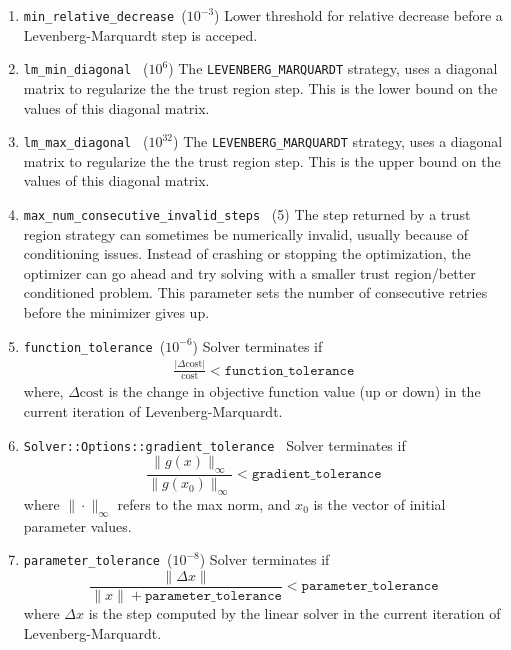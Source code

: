 \begin{enumerate}
\item{\texttt{min\_relative\_decrease }}($10^{-3}$) Lower threshold
  for relative decrease before a Levenberg-Marquardt step is acceped.

\item{\texttt{lm\_min\_diagonal } ($10^6$)} The
  \texttt{LEVENBERG\_MARQUARDT} strategy, uses a diagonal matrix to
  regularize the the trust region step. This is the lower bound on the
  values of this diagonal matrix.

\item{\texttt{lm\_max\_diagonal } ($10^{32}$)}  The
  \texttt{LEVENBERG\_MARQUARDT} strategy, uses a diagonal matrix to
  regularize the the trust region step. This is the upper bound on the
  values of this diagonal matrix.

\item{\texttt{max\_num\_consecutive\_invalid\_steps } (5)} The step
  returned by a trust region strategy can sometimes be numerically
  invalid, usually because of conditioning issues. Instead of crashing
  or stopping the optimization, the optimizer can go ahead and try
  solving with a smaller trust region/better conditioned problem. This
  parameter sets the number of consecutive retries before the
  minimizer gives up.

\item{\texttt{function\_tolerance }}($10^{-6}$) Solver terminates if
\begin{align}
\frac{|\Delta \text{cost}|}{\text{cost}} < \texttt{function\_tolerance}
\end{align}
where, $\Delta \text{cost}$ is the change in objective function value
(up or down) in the current iteration of Levenberg-Marquardt.

\item \texttt{Solver::Options::gradient\_tolerance } Solver terminates if
\begin{equation}
    \frac{\|g(x)\|_\infty}{\|g(x_0)\|_\infty} < \texttt{gradient\_tolerance}
\end{equation}
where $\|\cdot\|_\infty$ refers to the max norm, and $x_0$ is the vector of initial parameter values.

\item{\texttt{parameter\_tolerance }}($10^{-8}$) Solver terminates if
\begin{equation}
    \frac{\|\Delta x\|}{\|x\| + \texttt{parameter\_tolerance}} < \texttt{parameter\_tolerance}
\end{equation}
where $\Delta x$ is the step computed by the linear solver in the current iteration of Levenberg-Marquardt.


\end{enumerate}
